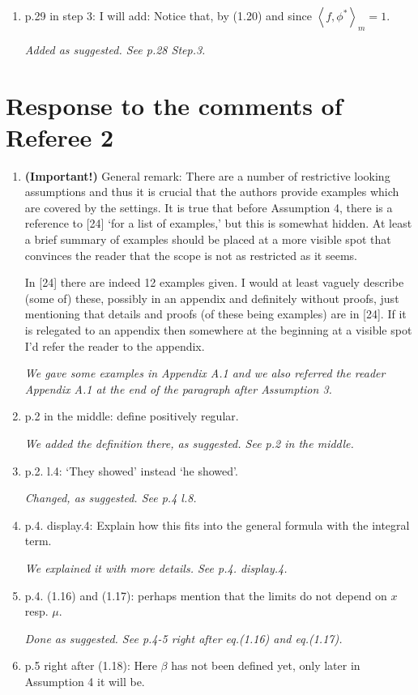 \documentclass[12pt,a4paper]{amsart}
\numberwithin{equation}{section}
\theoremstyle{plain}
\theoremstyle{definition}
\begin{document}
\begin{enumerate}
  {\it We give a new proof of this Lemma which is shorter and better. See p.33 Lemma A.8.}
\item
  p.29 in step 3: I will add: Notice that, by (1.20) and since $\left\langle f, \phi^* \right\rangle_m = 1$.

  {\it Added as suggested. See p.28 Step.3.}
\end{enumerate}
\section*{Response to the comments of Referee 2}
\begin{enumerate}
\item
  {\bf (Important!)} General remark: There are a number of restrictive looking assumptions and thus it is crucial that the authors provide examples which are covered by the settings.
  It is true that before Assumption 4, there is a reference to [24] `for a list of examples,' but this is somewhat hidden.
  At least a brief summary of examples should be placed at a more visible spot that convinces the reader that the scope is not as restricted as it seems.

  In [24] there are indeed 12 examples given.
  I would at least vaguely describe (some of) these, possibly in an appendix and definitely without proofs, just mentioning that details and proofs (of these being examples) are in [24].
  If it is relegated to an appendix then somewhere at the beginning at a visible spot I'd refer the reader to the appendix.

  {\it We gave some examples in Appendix A.1 and we also referred the reader Appendix A.1 at the end of the paragraph  after Assumption 3.}
\item
  p.2 in the middle: define positively regular.

  {\it We added the definition there, as suggested. See p.2 in the middle.}
\item
  p.2. l.4: `They showed' instead `he showed'.

  {\it Changed, as suggested. See p.4 l.8.}
\item
  p.4. display.4: Explain how this fits into the general formula with the integral term.

  {\it We explained it with more details. See p.4. display.4.}
\item
  p.4. (1.16) and (1.17): perhaps mention that the limits do not depend on $x$ resp. $\mu$.

  {\it Done as suggested. See p.4-5 right after eq.(1.16) and eq.(1.17).}
\item
  p.5 right after (1.18): Here $\beta$ has not been defined yet, only later in Assumption 4 it will be.


\end{enumerate}
\end{document}
